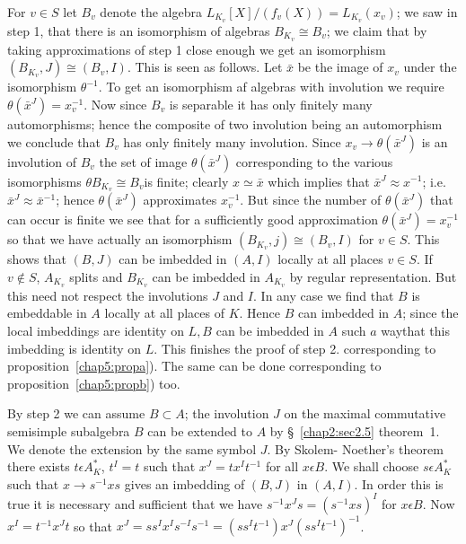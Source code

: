 \begin{step} %
For $v\in S$ let $B_v$ denote the algebra
$L_{K_v}[X]/(f_v(X))=L_{K_v}(x_v)$; we saw in step 1, that there is an
isomorphism of algebras $B_{K_v}\cong B_v$; we claim that by taking
approximations of step 1 close enough we get an isomorphism
$(B_{K_v},J)\cong (B_v,I)$. This is seen as follows. Let $\bar{x}$ be
the image of $x_v$ under the isomorphism $\theta^{-1}$. To get an
isomorphism af algebras with involution we require $\theta
(\bar{x}^J)=x^{-1}_{v}$. Now since $B_v$ is separable it has only
finitely many automorphisms; hence the composite of two involution
being an automorphism we conclude that $B_v$ has only finitely many
involution. Since $x_v\to \theta(\bar{x}^J)$ is an involution of $B_v$
the set of image $\theta(\bar{x}^J)$ corresponding to the various
isomorphisms $\theta B_{K_v}\cong B_v$is finite; clearly $x\simeq
\bar{x}$ which implies that $\bar{x}^J \approx x^{-1}$;
i.e. $\bar{x}^J\approx 
\bar{x}^{-1}$; hence $\theta (\bar{x}^J)$ approximates
$x^{-1}_{v}$. But since the number of $\theta(\bar{x}^J)$ that can
occur is finite we see that for a sufficiently good approximation
$\theta (\bar{x}^J)=x^{-1}_{v}$ so that we have actually an
isomorphism $(B_{K_v},j)\cong (B_v,I)$ for $v\in S$. This shows
that $(B,J)$ can be imbedded in $(A,I)$ locally at all places
$v\in S$. If $v\notin S$, $A_{K_v}$ splits and $B_{K_v}$ can
be imbedded in $A_{K_v}$ by regular representation. But this need not
respect the involutions $J$ and $I$. In any case we find that $B$ is
embeddable in $A$ locally at all places of $K$. Hence $B$ can imbedded
in $A$; since the local imbeddings are identity on $L, B$ can be
imbedded in $A$ such $a$ way\pageoriginale that this imbedding is
identity on $L$. This finishes the proof of step 2. corresponding to
proposition~\ref{chap5:propa}). The same can be done corresponding to 
proposition~\ref{chap5:propb}) too.   
\end{step}

\setcounter{proofofstep}{2}
\begin{proofofstep} %
 By step 2 we can assume $B\subset A$; the involution $J$ on the
 maximal commutative semisimple subalgebra $B$ can be extended to
 $A$ by \S~\ref{chap2:sec2.5} theorem~1. We denote
 the extension by the same 
 symbol $J$. By Skolem- Noether's theorem there exists $t\epsilon
 A^*_K$, $t^I=t$ such that $x^J=tx^It^{-1}$ for all $x\epsilon B$. We
 shall choose $s\epsilon A^*_K$ such that $x\to s^{-1}xs$ gives an
 imbedding of $(B,J)$ in $(A,I)$. In order this is true it is
 necessary and sufficient that we have $s^{-1}x^Js=(s^{-1}xs)^I$ for
 $x\epsilon B$. Now $x^I=t^{-1}x^Jt$ so that 
 $x^J=ss^Ix^Is^{-I}s^{-1}=(ss^It^{-1})x^J(ss^I t^{-1})^{-1}$. 
\end{proofofstep}

